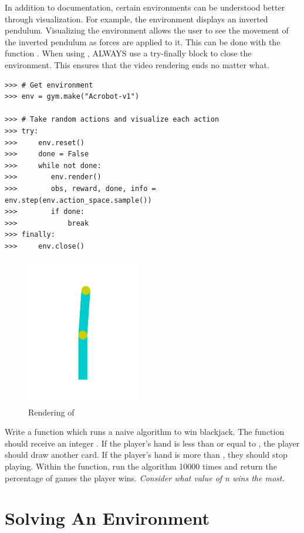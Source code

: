 In addition to documentation, certain environments can be understood better through visualization.
For example, the environment  displays an inverted pendulum.
Visualizing the environment allows the user to see the movement of the inverted pendulum as forces are applied to it.
This can be done with the function .
When using , ALWAYS use a try-finally block to close the environment.
This ensures that the video rendering ends no matter what.

\begin{lstlisting}
>>> # Get environment
>>> env = gym.make("Acrobot-v1")

>>> # Take random actions and visualize each action
>>> try:
>>>     env.reset()
>>>     done = False
>>>     while not done:
>>>        env.render()
>>>        obs, reward, done, info = env.step(env.action_space.sample())
>>>        if done:
>>>            break
>>> finally:
>>>     env.close()
\end{lstlisting}

\begin{figure}[H]
\includegraphics[width=5cm]{figures/acrobot.pdf}
\caption{Rendering of }
\end{figure}

\begin{problem}
Write a function  which runs a naive algorithm to win blackjack.
The function should receive an integer .
If the player's hand is less than or equal to , the player should draw another card.
If the player's hand is more than , they should stop playing. 
Within the function, run the algorithm 10000 times and return the percentage of games the player wins.
\textit{Consider what value of n wins the most.}
\label{prob:blackjack}
\end{problem}

\section*{Solving An Environment}

